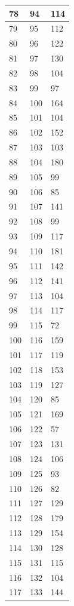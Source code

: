 \begin{tabular}{p{}p{}p{}}
\hline
78 & 94 & 114 \\
\hline
79 & 95 & 112 \\
\hline
80 & 96 & 122 \\
\hline
81 & 97 & 130 \\
\hline
82 & 98 & 104 \\
\hline
83 & 99 & 97 \\
\hline
84 & 100 & 164 \\
\hline
85 & 101 & 104 \\
\hline
86 & 102 & 152 \\
\hline
87 & 103 & 103 \\
\hline
88 & 104 & 180 \\
\hline
89 & 105 & 99 \\
\hline
90 & 106 & 85 \\
\hline
91 & 107 & 141 \\
\hline
92 & 108 & 99 \\
\hline
93 & 109 & 117 \\
\hline
94 & 110 & 181 \\
\hline
95 & 111 & 142 \\
\hline
96 & 112 & 141 \\
\hline
97 & 113 & 104 \\
\hline
98 & 114 & 117 \\
\hline
99 & 115 & 72 \\
\hline
100 & 116 & 159 \\
\hline
101 & 117 & 119 \\
\hline
102 & 118 & 153 \\
\hline
103 & 119 & 127 \\
\hline
104 & 120 & 85 \\
\hline
105 & 121 & 169 \\
\hline
106 & 122 & 57 \\
\hline
107 & 123 & 131 \\
\hline
108 & 124 & 106 \\
\hline
109 & 125 & 93 \\
\hline
110 & 126 & 82 \\
\hline
111 & 127 & 129 \\
\hline
112 & 128 & 179 \\
\hline
113 & 129 & 154 \\
\hline
114 & 130 & 128 \\
\hline
115 & 131 & 115 \\
\hline
116 & 132 & 104 \\
\hline
117 & 133 & 144 \\

\end{tabular}
